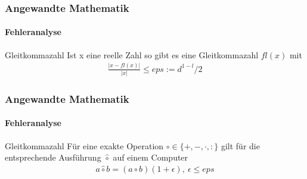 \documentclass{beamer}
\begin{document}
\begin{frame}
    \frametitle{Angewandte Mathematik}
\framesubtitle{Fehleranalyse}
    \begin{block}{Gleitkommazahl}
Ist x eine reelle Zahl so gibt es eine  Gleitkommazahl $fl(x)$ mit
\begin{align*}
\frac{|x-fl(x)| }{|x|} \leq eps := d^{1-l}/2
\end{align*}
\end{block}

 \end{frame}



\begin{frame}
    \frametitle{Angewandte Mathematik}
\framesubtitle{Fehleranalyse}
    \begin{block}{Gleitkommazahl}
Für eine exakte Operation $\circ \in \{+,-, \cdot, : \}$ gilt für die entsprechende Ausführung $\hat{\circ}$ auf einem Computer
\begin{align*}
a \hat{\circ}  b = (a \circ b) (1  + \epsilon) , \ \epsilon \leq eps 
\end{align*}
\end{block}
 \end{frame}
\end{document}
